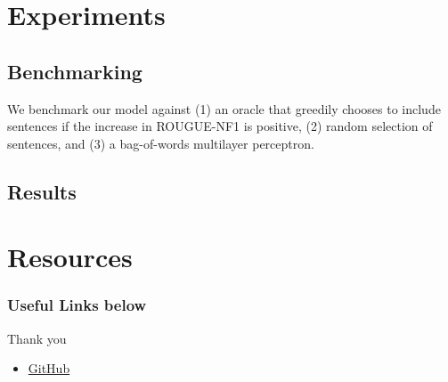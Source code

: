 \documentclass[]{beamer}
\begin{document}
	
\section{Experiments}
	\subsection{Benchmarking}
		\begin{frame}
		We benchmark our model against (1) an oracle that greedily chooses to include sentences if the increase in ROUGUE-NF1 is positive,  (2) random selection of sentences,  and (3) a bag-of-words multilayer perceptron.
		\end{frame}

	\subsection{Results}
		\begin{frame}
		\end{frame}


\section{Resources}
\begin{frame}
	\frametitle{Useful Links below}
	Thank you
	\begin{itemize}
	\item<1-> \href{https://github.com/franciscojavierarceo/DQN-Event-Summarization}{GitHub}
	\end{itemize}
\end{frame}


\end{document}
